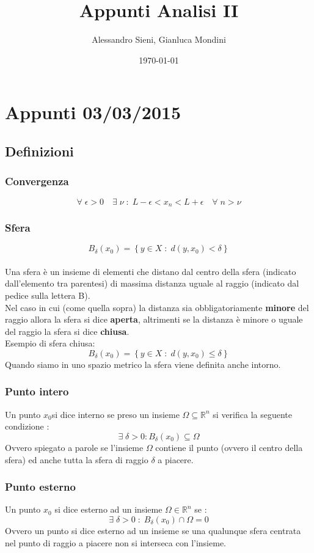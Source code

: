 \documentclass[fontsize = 20px, paper = a4]{article}
\author{Alessandro Sieni, Gianluca Mondini}
\title{Appunti Analisi II }
\date{\today}
\begin{document}
\maketitle
\newpage
\tableofcontents
\newpage
\section{Appunti 03/03/2015}
\subsection{Definizioni}
\subsubsection{Convergenza}
\hspace*{1cm}
$$\forall \; \epsilon > 0 \quad \exists \; \nu \; : \; L-\epsilon<x_n<L+\epsilon \quad \forall \; n > \nu$$ 
\subsubsection{Sfera}
\hspace*{1cm}
$$B_\delta(x_0) = \left \{ y \in X \; : \; d(y,x_0) < \delta \right\}$$ \\
Una sfera è un insieme di elementi che distano dal centro della sfera (indicato dall'elemento tra parentesi) di massima distanza uguale al raggio (indicato dal pedice sulla lettera B).\\
Nel caso in cui (come quella sopra) la distanza sia obbligatoriamente \textbf{minore} del raggio allora la sfera si dice \textbf{aperta}, altrimenti se la distanza è minore o uguale del raggio la sfera si dice \textbf{chiusa}. \\
Esempio di sfera chiusa:
$$B_\delta(x_0) = \left \{ y \in X \; : \; d(y,x_0) \le \delta \right\}$$ 
Quando siamo in uno spazio metrico la sfera viene definita anche intorno.
\subsubsection{Punto intero}
Un punto $x_0$si dice interno se preso un insieme $\Omega \subseteq \mathbb{R}^n$ si verifica la seguente condizione : 
$$\exists \; \delta > 0 : B_\delta (x_0) \subseteq \Omega$$
Ovvero spiegato a parole se l'insieme $\Omega$ contiene il punto (ovvero il centro della sfera) ed anche tutta la sfera di raggio $\delta$ a piacere.
\subsubsection{Punto esterno}
Un punto $x_0$ si dice esterno ad un insieme $\Omega \in \mathbb{R}^n$ se :
$$\exists \; \delta > 0 \; : \; B_\delta (x_0) \cap \Omega = 0$$
Ovvero un punto si dice esterno ad un insieme se una qualunque sfera centrata nel punto di raggio a piacere non si interseca con l'insieme.
\end{document}
